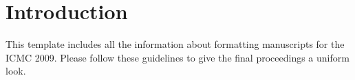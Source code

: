 \section{Introduction}

This template includes all the information about formatting manuscripts
for the ICMC 2009. Please follow these guidelines to give the final
proceedings a uniform look. 

\cite{allan02:harmonising}

